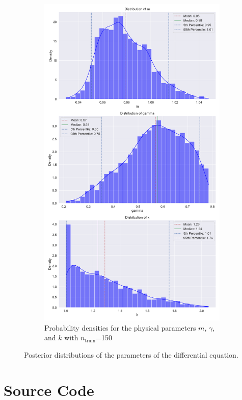\documentclass{article}
\newcommand{\nt}{$n_\text{train}$}
\begin{document}
\begin{figure}[htbp!]
    \hfill
    \begin{subfigure}[b]{0.45\textwidth}
        \centering
        \includegraphics[width=\textwidth]{plots/BPINN/oscilator1_150_[20, 20, 1]_combined_distribution.png}
        \caption{Probability densities for the physical parameters \( m \), \( \gamma  \), and \( k \) with \nt=150}
        \label{fig:plot2}
    \end{subfigure} 
    \caption{Posterior distributions of the parameters of the differential equation.}
    \label{fig:post_dens_params}
\end{figure}
\newpage
\printbibliography
\newpage
\appendix
\section{Source Code}





\end{document}
